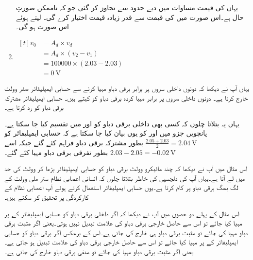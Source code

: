 \begin{enumerate}
یہاں  کی قیمت مساوات   میں دیے حدود سے تجاوز کر گئی جو کہ ناممکن صورتِ حال ہے۔اس صورت میں  کی قیمت   سے قدر زیادہ قیمت اختیار کرے گی۔ لیتے ہوئے اس صورت ہو گی۔
\item $\begin{aligned}[t]
v_0 &=A_d \times v_d \\
&=A_d \times \left (v_2 - v_1 \right )\\
&=100000 \times \left(2.03-2.03 \right )\\
&=\SI{0}{\volt}
\end{aligned}$
\end{enumerate}
یہاں آپ نے دیکھا کہ دونوں داخلی سروں پر برابر برقی دباو مہیا کرنے سے حسابی ایمپلیفائر صفر وولٹ خارج کرتا ہے۔ دونوں داخلی سروں پر برابر مہیا کردہ برقی دباو کو   کہتے ہیں۔ حسابی ایمپلیفائر مشترکہ برقی دباو کو رد کرتا ہے۔


یہاں یہ بتلاتا چلوں کہ کسی بھی داخلی برقی دباو کو   اور   میں تقسیم کیا جا سکتا ہے۔پانچویں جزو میں  اور  کو یوں بیان کیا جا سکتا ہے کہ حسابی ایمپلیفائر کو 
\( \tfrac{2.05+2.03}{2}=\SI{2.04}{\volt} \)
بطور مشترکہ برقی دباو فراہم کئے گئے جبکہ اسے
\( 2.03-2.05=\SI{-0.02}{\volt}\)
بطور تفرقی برقی دباو مہیا کئے گئے۔


	اس مثال میں آپ نے دیکھا کہ چند مائیکرو وولٹ برقی دباو کو حسابی ایمپلیفائر بڑھا کر وولٹ کی حد میں لے آتا ہے۔یہاں آپ کی دلچسپی کی خاطر بتلاتا چلوں کہ انسانی اعصابی نظام  ستر ملی وولٹ  کے لگ بھگ برقی دباو پر کام کرتا ہے۔یوں حسابی ایمپلیفائر استعمال کرتے ہوئے  آپ اعصابی نظام کے کارکردگی پر تحقیق کر سکتے ہیں۔ 

	اس مثال کے پہلے دو حصوں میں آپ نے دیکھا کہ اگر داخلی برقی دباو کو حسابی ایمپلیفائر کے   پر مہیا کیا جائے تو اس سے حاصل خارجی برقی دباو کی علامت تبدیل نہیں ہوتی۔یعنی اگر مثبت برقی دباو مہیا کی جائے تو مثبت برقی دباو ہی خارج کی جاتی ہے۔اس کے برعکس اگر برقی دباو کو حسابی ایمپلیفائر کے   پر مہیا کیا جائے تو اس سے حاصل خارجی برقی دباو کی علامت تبدیل ہو جاتی ہے۔یعنی اگر مثبت برقی دباو مہیا کی جائے تو منفی برقی دباو خارج کی جاتی ہے۔

